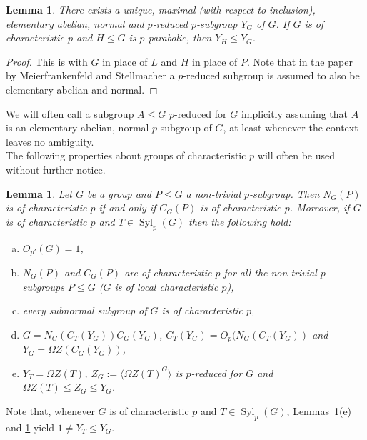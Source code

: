 \documentclass{amsart}
\numberwithin{equation}{section}
\newtheorem{lemma}[equation]{Lemma}
\theoremstyle{definition}
\theoremstyle{subresult}
\theoremstyle{caseresult}
\newcommand{\Syl}{\operatorname{Syl}}
\newcommand{\<}{\langle}
\renewcommand{\>}{\rangle}
\begin{document}
\begin{lemma}\label{lemma:unique largest p-reduced}
    There exists a unique, maximal (with respect to inclusion), elementary abelian, normal and $p$-reduced $p$-subgroup $Y_G$ of $G$.    If $G$ is of characteristic $p$ and $H \le G$ is $p$-parabolic, then $Y_H \le Y_G$.
\end{lemma}
\begin{proof}
    This is \cite[Lemma 2.2]{MS:2009} with $G$ in place of $L$ and $H$ in place of $P$. Note that in the paper by Meierfrankenfeld and Stellmacher a $p$-reduced subgroup is assumed to also be elementary abelian and normal.
\end{proof}

We will often call a subgroup $A \le G$ $p$-reduced for $G$ implicitly assuming that $A$ is an elementary abelian, normal $p$-subgroup of $G$, at least whenever the context leaves no ambiguity.\\

The following properties about groups of characteristic $p$ will often be used without further notice.

\begin{lemma}\label{lemma:properties groups of char p}
    Let $G$ be a group and $P \le G$ a non-trivial $p$-subgroup. Then $N_G(P)$ is of characteristic $p$ if and only if $C_G(P)$ is of characteristic $p$. Moreover, if $G$ is of characteristic $p$ and $T \in \Syl_p(G)$ then the following hold:
    \begin{enumerate}[(a)]
        \item $O_{p'}(G)=1$,
        \item $N_G(P)$ and $C_G(P)$ are of characteristic $p$ for all the non-trivial $p$-subgroups $P \le G$ ($G$ is of local characteristic $p$),
        \item every subnormal subgroup of $G$ is of characteristic $p$,
        \item $G=N_G(C_T(Y_G)) C_G(Y_G)$, $C_T(Y_G) = O_p(N_G(C_T(Y_G))$ and $Y_G=\Omega Z(C_G(Y_G))$,
        \item $Y_T = \Omega Z(T)$, $Z_G := \< \Omega Z(T)^G \>$ is $p$-reduced for $G$ and $\Omega Z(T) \le Z_G \le Y_G$.
    \end{enumerate}
\end{lemma}

Note that, whenever $G$ is of characteristic $p$ and $T \in \Syl_p(G)$, Lemmas~\ref{lemma:properties groups of char p}(e) and \ref{lemma:unique largest p-reduced} yield $1 \ne Y_T \le Y_G$.
\end{document}
